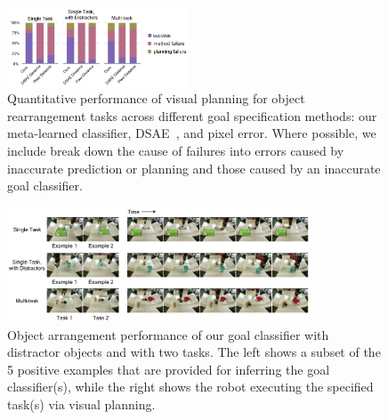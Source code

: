 

\begin{figure}
    \centering
    \includegraphics[width=0.48\textwidth]{images_cls/cls_charts.jpeg}
    \caption{\small Quantitative performance of visual planning for object rearrangement tasks across different goal specification methods: our meta-learned classifier, DSAE~\cite{finn_nips}, and pixel error. Where possible, we include break down the cause of failures into errors caused by inaccurate prediction or planning and those caused by an inaccurate goal classifier.}
    \label{fig:cls_charts}
    \vspace{-0.3cm}
\end{figure}


\begin{figure}
    \centering
    \includegraphics[width=0.8\textwidth]{images_cls/cls_results.jpeg}
    \caption{\small Object arrangement performance of our goal classifier with distractor objects and with two tasks. The left shows a subset of the 5 positive examples that are provided for inferring the goal classifier(s), while the right shows the robot executing the specified task(s) via visual planning.}
    \label{fig:cls_results}
    \vspace{-0.3cm}
\end{figure}
